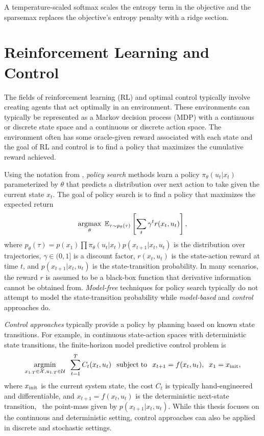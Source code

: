 \begin{corollary}
A temperature-scaled softmax scales the entropy term in the objective
and the sparsemax \citep{martins2016softmax} replaces the
objective's entropy penalty with a ridge section.
\end{corollary}

\section{Reinforcement Learning and Control}
\label{sec:bg:rl}

The fields of reinforcement learning (RL) and optimal control
typically involve creating agents that act optimally
in an environment.
These environments can typically be represented
as a Markov decision process (MDP) with a continuous
or discrete state space and a continuous or discrete action space.
The environment often has some oracle-given
reward associated with each state and the goal of RL
and control is to find a policy that maximizes the
cumulative reward achieved.

Using the notation from \citep{levine2017introduction},
\emph{policy search} methods learn a policy $\pi_\theta(u_t|x_t)$
parameterized by $\theta$ that predicts a distribution over next
action to take given the current state $x_t$.
The goal of policy search is to find a policy that maximizes the
expected return
\begin{equation}
  \operatorname*{argmax}_\theta\; \mathbb{E}_{\tau\sim p_\theta(\tau)} \left[ \sum_t \gamma^t r(x_t, u_t) \right],
\end{equation}
where $p_\theta(\tau)=p(x_1)\prod\pi_\theta(u_t|x_t)p(x_{t+1}|x_t,u_t)$
is the distribution over trajectories,
$\gamma\in(0,1]$ is a discount factor,
$r(x_t, u_t)$ is the state-action reward at time $t$,
and $p(x_{t+1}|x_t,u_t)$ is the state-transition probability.
In many scenarios, the reward $r$ is assumed to be
a black-box function that derivative information cannot
be obtained from.
\emph{Model-free} techniques for policy search typically do
not attempt to model the state-transition probability
while \emph{model-based} and \emph{control} approaches do.

\emph{Control approaches} typically provide a policy
by planning based on known state transitions.
For example, in continuous state-action spaces with deterministic
state transitions, the finite-horizon model predictive control problem is
\begin{equation}
    \operatorname*{argmin}_{x_{1:T} \in \mathcal{X},u_{1:T}\in \mathcal{U}} \;\; \sum_{t=1}^T  C_t(x_t, u_t)
    \;\; \operatorname*{subject\;to} \;\; x_{t+1} = f(x_t, u_t), \;\; x_1 = x_{\rm init},
\end{equation}
where $x_{\rm init}$ is the current system state,
the cost $C_t$ is typically hand-engineered and differentiable,
and $x_{t+1}=f(x_t, u_t)$ is the deterministic
next-state transition, \ie~the point-mass given by $p(x_{t+1}|x_t,u_t)$.
While this thesis focuses on the continuous and deterministic setting,
control approaches can also be applied in discrete
and stochastic settings.

